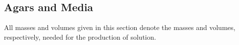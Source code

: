\subsection{Agars and Media}
All masses and volumes given in this section denote the masses and volumes, respectively, needed for the production of  solution.

